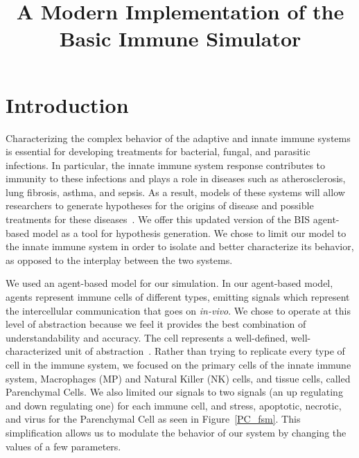 \documentclass[10pt,conference]{IEEEtran}
\begin{document}
\title{A Modern Implementation of the \\
Basic Immune Simulator}

\author{
}

\maketitle
\thispagestyle{plain}
\pagestyle{plain}

\section{Introduction}
\noindent
Characterizing the complex behavior of the adaptive and innate immune systems
is essential for developing treatments for bacterial, fungal, and parasitic
infections. In particular, the innate immune system response contributes to
immunity to these infections and plays a role in diseases such as
atherosclerosis, lung fibrosis, asthma, and sepsis. As a result, models of
these systems will allow researchers to generate hypotheses for the origins of
disease and possible treatments for these diseases~\cite{Folcik:2007}. We offer
this updated version of the BIS agent-based model as a tool for hypothesis
generation. We chose to limit our model to the innate immune system in order to
isolate and better characterize its behavior, as opposed to the interplay
between the two systems.

\indent
We used an agent-based model for our simulation. In our agent-based model,
agents represent immune cells of different types, emitting signals which
represent the intercellular communication that goes on \textit{in-vivo}. We
chose to operate at this level of abstraction because we feel it provides the
best combination of understandability and accuracy. The cell represents a
well-defined, well-characterized unit of abstraction~\cite{Folcik:2007}.
Rather than trying to replicate every type of cell in the immune system, we
focused on the primary cells of the innate immune system, Macrophages (MP) and
Natural Killer (NK) cells, and tissue cells, called Parenchymal Cells. We also
limited our signals to two signals (an up regulating and down regulating one)
for each immune cell, and stress, apoptotic, necrotic, and virus for the
Parenchymal Cell as seen in Figure~\ref{PC_fsm}. This simplification allows us
to modulate the behavior of our system by changing the values of a few
parameters.
\end{document}

